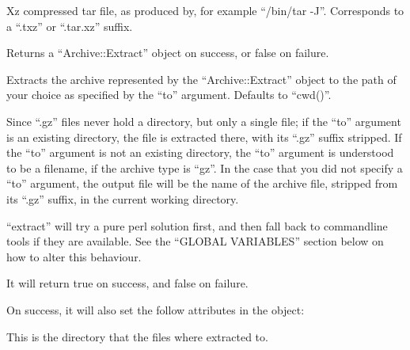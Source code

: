 \documentclass[]{article}
\begin{document}
\begin{description}
\itemsep1pt\parskip0pt
\item[txz]
Xz compressed tar file, as produced by, for example ``/bin/tar -J''.
Corresponds to a ``.txz'' or ``.tar.xz'' suffix.
\end{description}

Returns a ``Archive::Extract'' object on success, or false on failure.


Extracts the archive represented by the ``Archive::Extract'' object to
the path of your choice as specified by the ``to'' argument. Defaults to
``cwd()''.

Since ``.gz'' files never hold a directory, but only a single file; if
the ``to'' argument is an existing directory, the file is extracted
there, with its ``.gz'' suffix stripped. If the ``to'' argument is not
an existing directory, the ``to'' argument is understood to be a
filename, if the archive type is ``gz''. In the case that you did not
specify a ``to'' argument, the output file will be the name of the
archive file, stripped from its ``.gz'' suffix, in the current working
directory.

``extract'' will try a pure perl solution first, and then fall back to
commandline tools if they are available. See the ``GLOBAL VARIABLES''
section below on how to alter this behaviour.

It will return true on success, and false on failure.

On success, it will also set the follow attributes in the object:

\begin{description}
\itemsep1pt\parskip0pt
\item[\$ae-\textgreater{}extract\_path]
This is the directory that the files where extracted to.
\end{description}
\end{document}
